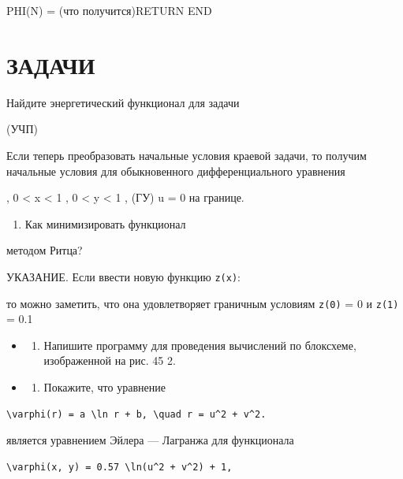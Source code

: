 \documentclass[
  ukrainian,
]{article}
\providecommand{\tightlist}{%
  \setlength{\itemsep}{0pt}\setlength{\parskip}{0pt}}
\begin{document}
PHI(N) = (что получится)RETURN END

\section{\texorpdfstring{\textbf{ЗА}ДАЧИ}{ЗАДАЧИ}}\label{ux437ux430ux434ux430ux447ux438-1}

Найдите энергетический функционал для задачи

(УЧП)

Если теперь преобразовать начальные условия краевой задачи, то получим
начальные условия для обыкновенного дифференциального уравнения

, 0 \textless{} x \textless{} 1 , 0 \textless{} y \textless{} 1 , (ГУ) u
= 0 на границе.

\begin{enumerate}
\def\labelenumi{\arabic{enumi}.}
\setcounter{enumi}{1}
\tightlist
\item
  Как минимизировать функционал
\end{enumerate}

методом Ритца?

УКАЗАНИЕ. Если ввести новую функцию \texttt{z(x)}:

то можно заметить, что она удовлетворяет граничным условиям
\texttt{z(0)} = 0 и \texttt{z(1)} = 0.1

\begin{itemize}
\tightlist
\item
  \begin{enumerate}
  \def\labelenumi{\arabic{enumi}.}
  \setcounter{enumi}{2}
  \tightlist
  \item
    Напишите программу для проведения вычислений по блоксхеме,
    изображенной на рис. 45 2.
  \end{enumerate}
\item
  \begin{enumerate}
  \def\labelenumi{\arabic{enumi}.}
  \setcounter{enumi}{3}
  \tightlist
  \item
    Покажите, что уравнение
  \end{enumerate}
\end{itemize}

\begin{verbatim}
\varphi(r) = a \ln r + b, \quad r = u^2 + v^2.
\end{verbatim}

является уравнением Эйлера --- Лагранжа для функционала

\begin{verbatim}
\varphi(x, y) = 0.57 \ln(u^2 + v^2) + 1,
\end{verbatim}
\end{document}
